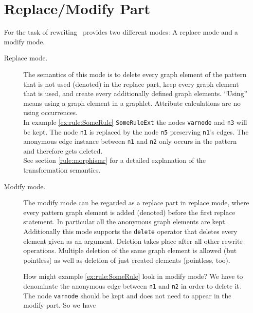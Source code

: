 \section{Replace/Modify Part}
\label{replacepart}
For the task of rewriting \GrG\ provides two different modes: A replace mode and a modify mode.
\begin{description}
  \item[Replace mode.] The semantics of this mode is to delete every graph element of the pattern that is not used (denoted) in the replace part, keep every graph element that is used, and create every additionally defined graph elements. ``Using'' means using a graph element in a graphlet. Attribute calculations are no using occurrences.\\
  In example \ref{ex:rule:SomeRule} \texttt{SomeRuleExt} the nodes \texttt{varnode} and \texttt{n3} will be kept. The node \texttt{n1} is replaced by the node \texttt{n5} preserving \texttt{n1}'s edges. The anonymous edge instance between \texttt{n1} and \texttt{n2} only occurs in the pattern and therefore gets deleted.\\
See section \ref{rule:morphismr} for a detailed explanation of the transformation semantics. 
  \item[Modify mode.] The modify mode can be regarded as a replace part in replace mode, where every pattern graph element is added (denoted) before the first replace statement. 
In particular all the anonymous graph elements are kept. 
Additionally this mode supports the \texttt{delete} operator that deletes every element given as an argument. 
Deletion takes place after all other rewrite operations. Multiple deletion of the same graph element is allowed (but pointless) as well as deletion of just created elements (pointless, too).
\begin{example}
How might example \ref{ex:rule:SomeRule} look in modify mode? 
We have to denominate the anonymous edge between \texttt{n1} and \texttt{n2} in order to delete it. 
The node \texttt{varnode} should be kept and does not need to appear in the modify part. 
So we have
\begin{grgen}
rule SomeRuleExtModify(varnode: Node): (Node, EdgeTypeB)  {
  pattern {
    ...
    n1 -e0:Edge-> n2;
    ...
  }
  modify {
    n5 : NodeTypeC<n1>;
    n3 -e1:EdgeTypeB-> n5;
    delete(e0);
    eval {
      ...
\end{grgen}
\end{example}
\end{description}

